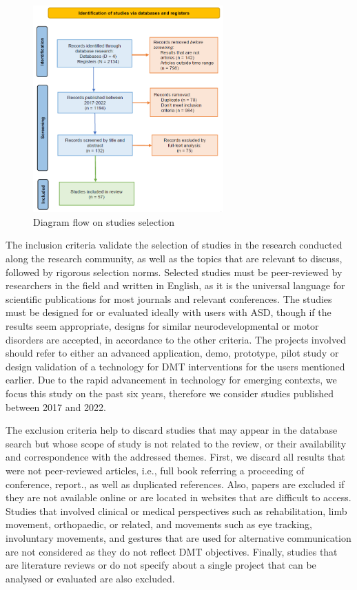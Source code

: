 \documentclass[a4paper,fleqn]{cas-sc}
\begin{document}
\begin{figure}
	\includegraphics[width=0.65\textwidth]{fig1_search_flow.png}
        \centering
	  \caption{Diagram flow on studies selection}\label{fig1}
        \label{fig:studies-flow}
\end{figure}


The inclusion criteria validate the selection of studies in the research conducted along the research community, as well as the topics that are relevant to discuss, followed by rigorous selection norms. Selected studies must be peer-reviewed by researchers in the field and written in English, as it is the universal language for scientific publications for most journals and relevant conferences. The studies must be designed for or evaluated ideally with users with ASD, though if the results seem appropriate, designs for similar neurodevelopmental or motor disorders are accepted, in accordance to the other criteria. The projects involved should refer to either an advanced application, demo, prototype, pilot study or design validation of a technology for DMT interventions for the users mentioned earlier. Due to the rapid advancement in technology for emerging contexts, we focus this study on the past six years, therefore we consider studies published between 2017 and 2022.


The exclusion criteria help to discard studies that may appear in the database search but whose scope of study is not related to the review, or their availability and correspondence with the addressed themes. First, we discard all results that were not peer-reviewed articles, i.e., full book referring a proceeding of conference, report., as well as duplicated references. Also, papers are excluded if they are not available online or are located in websites that are difficult to access. Studies that involved clinical or medical perspectives such as rehabilitation, limb movement, orthopaedic, or related, and movements such as eye tracking, involuntary movements, and gestures that are used for alternative communication are not considered as they do not reflect DMT objectives. Finally, studies that are literature reviews or do not specify about a single project that can be analysed or evaluated are also excluded.
\end{document}
